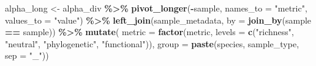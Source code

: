\documentclass[
]{book}
\newenvironment{Shaded}{\begin{snugshade}}{\end{snugshade}}
\newcommand{\AttributeTok}[1]{\textcolor[rgb]{0.13,0.29,0.53}{#1}}
\newcommand{\FunctionTok}[1]{\textcolor[rgb]{0.13,0.29,0.53}{\textbf{#1}}}
\newcommand{\NormalTok}[1]{#1}
\newcommand{\OtherTok}[1]{\textcolor[rgb]{0.56,0.35,0.01}{#1}}
\newcommand{\SpecialCharTok}[1]{\textcolor[rgb]{0.81,0.36,0.00}{\textbf{#1}}}
\newcommand{\StringTok}[1]{\textcolor[rgb]{0.31,0.60,0.02}{#1}}
\begin{document}
\begin{Shaded}
\begin{Highlighting}[]
\NormalTok{alpha\_long }\OtherTok{\textless{}{-}}\NormalTok{ alpha\_div }\SpecialCharTok{\%\textgreater{}\%}
  \FunctionTok{pivot\_longer}\NormalTok{(}\SpecialCharTok{{-}}\NormalTok{sample, }\AttributeTok{names\_to =} \StringTok{"metric"}\NormalTok{, }\AttributeTok{values\_to =} \StringTok{"value"}\NormalTok{) }\SpecialCharTok{\%\textgreater{}\%}
  \FunctionTok{left\_join}\NormalTok{(sample\_metadata, }\AttributeTok{by =} \FunctionTok{join\_by}\NormalTok{(sample }\SpecialCharTok{==}\NormalTok{ sample)) }\SpecialCharTok{\%\textgreater{}\%}
  \FunctionTok{mutate}\NormalTok{(}
    \AttributeTok{metric =} \FunctionTok{factor}\NormalTok{(metric, }\AttributeTok{levels =} \FunctionTok{c}\NormalTok{(}\StringTok{"richness"}\NormalTok{, }\StringTok{"neutral"}\NormalTok{, }\StringTok{"phylogenetic"}\NormalTok{, }\StringTok{"functional"}\NormalTok{)),}
    \AttributeTok{group =} \FunctionTok{paste}\NormalTok{(species, sample\_type, }\AttributeTok{sep =} \StringTok{"\_"}\NormalTok{))}
\end{Highlighting}
\end{Shaded}
\end{document}

